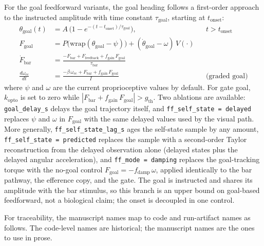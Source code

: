 \documentclass[pdflatex,sn-nature]{sn-jnl}
\begin{document}
For the goal feedforward variants, the goal heading follows a first-order approach to the instructed amplitude with time constant $\tau_{\mathrm{goal}}$, starting at $t_{\mathrm{onset}}$:
\begin{align}
\theta_{\mathrm{goal}}(t) &= A\,\bigl(1 - e^{-(t - t_{\mathrm{onset}})/\tau_{\mathrm{goal}}}\bigr), && t > t_{\mathrm{onset}} \\
F_{\mathrm{goal}} &= P\bigl(\mathrm{wrap}(\theta_{\mathrm{goal}} - \psi)\bigr) + (\dot\theta_{\mathrm{goal}} - \omega)\,V(\cdot) \\
\dot F_{\mathrm{bar}} &= \frac{-F_{\mathrm{bar}} + F_{\mathrm{feedback}} + f_{\mathrm{gain}}\,F_{\mathrm{goal}}}{\tau_{\mathrm{bar}}} \\
\frac{d\omega_{\mathrm{ec}}}{dt} &= \frac{-\beta\,\omega_{\mathrm{ec}} + F_{\mathrm{bar}} + f_{\mathrm{gain}}\,F_{\mathrm{goal}}}{I} && \text{(graded goal)}
\end{align}
where $\psi$ and $\omega$ are the current proprioceptive values by default. For gate goal, $k_{\mathrm{opto}}$ is set to zero while $|F_{\mathrm{bar}} + f_{\mathrm{gain}}\,F_{\mathrm{goal}}| > g_{\mathrm{th}}$. Two ablations are available: \texttt{goal\_delay\_s} delays the goal trajectory itself, and \texttt{ff\_self\_state = delayed} replaces $\psi$ and $\omega$ in $F_{\mathrm{goal}}$ with the same delayed values used by the visual path. More generally, \texttt{ff\_self\_state\_lag\_s} ages the self-state sample by any amount, \texttt{ff\_self\_state = predicted} replaces the sample with a second-order Taylor reconstruction from the delayed observation alone (delayed states plus the delayed angular acceleration), and \texttt{ff\_mode = damping} replaces the goal-tracking torque with the no-goal control $F_{\mathrm{goal}} = -f_{\mathrm{damp}}\,\omega$, applied identically to the bar pathway, the efference copy, and the gate. The goal is instructed and shares its amplitude with the bar stimulus, so this branch is an upper bound on goal-based feedforward, not a biological claim; the onset is decoupled in one control.

For traceability, the manuscript names map to code and run-artifact names as follows. The code-level names are historical; the manuscript names are the ones to use in prose.
\end{document}
